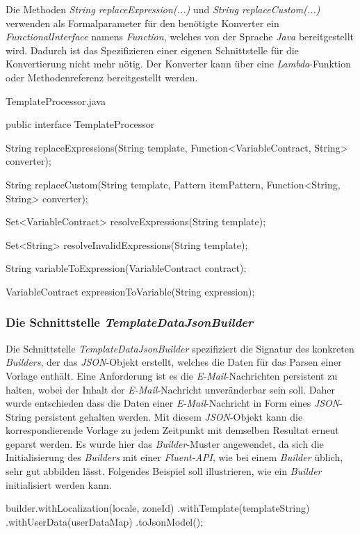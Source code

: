 Die Methoden \emph{String replaceExpression(...)} und \emph{String replaceCustom(...)} verwenden als Formalparameter für den benötigte Konverter ein \emph{FunctionalInterface} namens \emph{Function}, welches von der Sprache \emph{Java} bereitgestellt wird. Dadurch ist das Spezifizieren einer eigenen Schnittstelle für die Konvertierung nicht mehr nötig. Der Konverter kann über eine \emph{Lambda}-Funktion oder Methodenreferenz bereitgestellt werden. 
\newpage

\begin{program}[h]
\caption{TemplateProcessor.java}
\label{prog:templateProcessor}
\begin{JavaCode}
public interface TemplateProcessor {

    String replaceExpressions(String template,
                              Function<VariableContract, String> converter);

    String replaceCustom(String template,
                         Pattern itemPattern,
                         Function<String, String> converter);

    Set<VariableContract> resolveExpressions(String template);

    Set<String> resolveInvalidExpressions(String template);

    String variableToExpression(VariableContract contract);

    VariableContract expressionToVariable(String expression);
}
\end{JavaCode}
\end{program}

\subsubsection{Die Schnittstelle \emph{TemplateDataJsonBuilder}}
\label{sec:templateDataJsonBuilder}
Die Schnittstelle \emph{TemplateDataJsonBuilder} spezifiziert die Signatur des konkreten \emph{Builders}, der das \emph{JSON}-Objekt erstellt, welches die Daten für das Parsen einer Vorlage enthält. Eine Anforderung ist es die \emph{E-Mail}-Nachrichten persistent zu halten, wobei der Inhalt der \emph{E-Mail}-Nachricht unveränderbar sein soll. Daher wurde entschieden dass die Daten einer \emph{E-Mail}-Nachricht in Form eines \emph{JSON}-String persistent gehalten werden. Mit diesem \emph{JSON}-Objekt kann die korrespondierende Vorlage zu jedem Zeitpunkt mit demselben Resultat erneut geparst werden.
\newline
\newline
Es wurde hier das \emph{Builder}-Muster angewendet, da sich die Initialisierung des \emph{Builders} mit einer \emph{Fluent-API}, wie bei einem \emph{Builder} üblich, sehr gut abbilden lässt. Folgendes Beispiel soll illustrieren, wie ein \emph{Builder} initialisiert werden kann.
\begin{JavaCode}[numbers=none]
builder.withLocalization(locale, zoneId)
       .withTemplate(templateString)
       .withUserData(userDataMap)
       .toJsonModel();
\end{JavaCode}
\newpage

